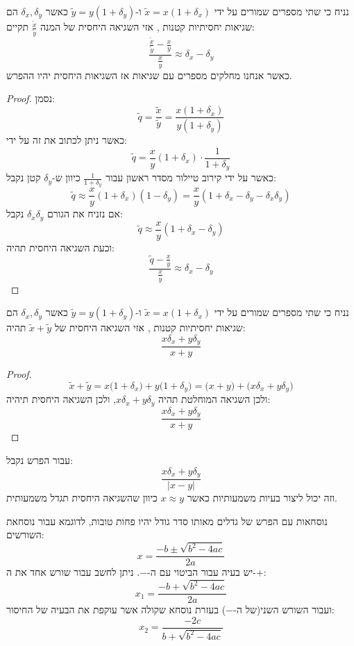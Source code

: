 \documentclass{tstextbook}
\begin{document}
\begin{proposition}
נניח כי שתי מספרים שמורים על ידי \(\tilde{x}=x(1+\delta_{x})\) ו-\(\tilde{y}=y(1+\delta_{y})\) כאשר \(\delta_{x},\delta_{y}\) הם שגיאות יחסיתיות קטנות , אזי השגיאה היחסית של המנה \(\frac{\tilde{x}}{\tilde{y}}\) תקיים:
$$\frac{\frac{\tilde{x}}{\tilde{y}}-\frac{x}{y}}{\frac{x}{y}}\approx \delta_{x}-\delta_{y}$$
כאשר אנחנו מחלקים מספרים עם שגיאות אז השגיאות היחסית יהיו ההפרש.

\end{proposition}
\begin{proof}
נסמן:
$$\tilde{q}=\frac{\tilde{x}}{\tilde{y}}=\frac{x(1+\delta_{x})}{y(1+\delta_{y})}$$
כאשר ניתן לכתוב את זה על ידי:
$$\tilde{q}=\frac{x}{y}(1+\delta_{x})\cdot\frac{1}{1+\delta_{y}}$$
כאשר על ידי קירוב טיילור מסדר ראשון עבור \(\frac{1}{1+\delta_{y}}\) כיוון ש-\(\delta_{y}\) קטן נקבל:
$$\tilde{q}\approx\frac{x}{y}(1+\delta_{x})(1-\delta_{y})=\frac{x}{y}(1+\delta_{x}-\delta_{y}-\delta_{x}\delta_{y})$$
אם נזניח את הגורם \(\delta_{x}\delta_{y}\) נקבל:
$$\tilde{q}\approx\frac{x}{y}(1+\delta_{x}-\delta_{y})$$
וכעת השגיאה היחסית תהיה:
$${\frac{\tilde{q}-{\frac{x}{y}}}{{\frac{x}{y}}}}\approx\delta_{x}-\delta_{y}$$

\end{proof}
\begin{proposition}
נניח כי שתי מספרים שמורים על ידי \(\tilde{x}=x(1+\delta_{x})\) ו-\(\tilde{y}=y(1+\delta_{y})\) כאשר \(\delta_{x},\delta_{y}\) הם שגיאות יחסיתיות קטנות , אזי השגיאה היחסית של \(\tilde{x}+\tilde{y}\) תהיה:
$$\frac{x\delta_{x}+y\delta_{y}}{x+y}$$

\end{proposition}
\begin{proof}
$${\tilde{x}}+{\tilde{y}}=x{\big(}1+\delta_{x}{\big)}+y{\big(}1+\delta_{y}{\big)}={\big(}x+y{\big)}+{\big(}x\delta_{x}+y\delta_{y}{\big)}$$
ולכן השגיאה המוחלטת תהיה \(x\delta_{x}+y\delta_{y}\), ולכן השגיאה היחסית תיהיה:
$$\frac{x\delta_{x}+y\delta_{y}}{x+y}$$

\end{proof}
\begin{corollary}
עבור הפרש נקבל:
$${\frac{x\delta_{x}+y\delta_{y}}{|x-y|}}$$
וזה יכול ליצור בעיות משמעותיות כאשר \(x \approx y\) כיוון שהשגיאה היחסית תגדל משמעותית.

\end{corollary}
\begin{corollary}
נוסחאות עם הפרש של גדלים מאותו סדר גודל יהיו פחות טובות, לדוגמא עבור נוסחאת השורשים:
$$x={\frac{-b\pm{\sqrt{b^{2}-4a c}}}{2a}}$$
יש בעיה עבור הביטוי עם ה-\(-\). ניתן לחשב עבור שורש אחד את ה-\(+\):
$$x_{1}={\frac{-b+{\sqrt{b^{2}-4a c}}}{2a}}$$
ועבור השורש השני(של ה-\(-\)) בעזרת נוסחא שקולה אשר עוקפת את הבעיה של החיסור:
$$x_{2}={\frac{-2c}{b+{\sqrt{b^{2}-4a c}}}}$$

\end{corollary}
\end{document}
